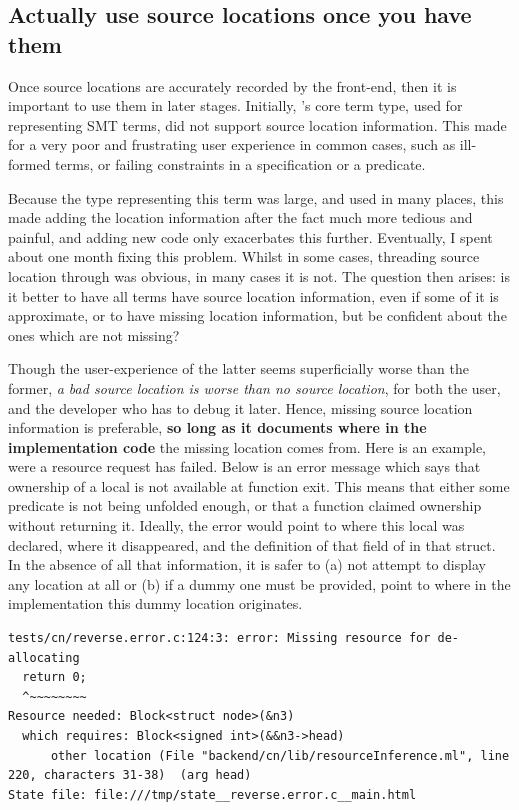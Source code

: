 \subsection{Actually use source locations once you have them}

Once source locations are accurately recorded by the front-end, then it is
important to use them in later stages. Initially, 's core term type,
used for representing SMT terms, did not support source location information.
This made for a very poor and frustrating user experience in common cases, such
as ill-formed terms, or failing constraints in a specification or a predicate.

Because the type representing this term was large, and used in many places,
this made adding the location information after the fact much more tedious and
painful, and adding new code only exacerbates this further. Eventually, I spent
about one month fixing this
problem. Whilst in some cases, threading source location through was obvious,
in many cases it is not. The question then arises: is it better to have all
terms have source location information, even if some of it is approximate,
or to have missing location information, but be confident about the ones
which are not missing?

Though the user-experience of the latter seems superficially worse than the
former, \emph{a bad source location is worse than no source location}, for both
the user, and the developer who has to debug it later. Hence, missing source
location information is preferable, \textbf{so long as it documents where in
the implementation code} the missing location comes from. Here is an example,
were a resource request has failed. Below is an error message which says that
ownership of a local is not available at function exit. This means that either
some predicate is not being unfolded enough, or that a function claimed
ownership without returning it. Ideally, the error would point to where this
local was declared, where it disappeared, and the definition of that field of
in that struct. In the absence of all that information, it is safer to (a) not
attempt to display any location at all or (b) if a dummy one must be provided,
point to where in the implementation this dummy location originates.

\begin{verbatim}
tests/cn/reverse.error.c:124:3: error: Missing resource for de-allocating
  return 0;
  ^~~~~~~~~
Resource needed: Block<struct node>(&n3)
  which requires: Block<signed int>(&&n3->head)
      other location (File "backend/cn/lib/resourceInference.ml", line 220, characters 31-38)  (arg head)
State file: file:///tmp/state__reverse.error.c__main.html
\end{verbatim}

